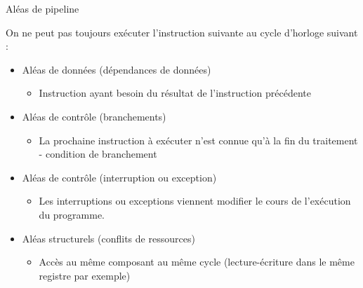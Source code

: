 %
\begin{Frame}{Aléas de pipeline}

\begin{block}{On ne peut pas toujours exécuter l'instruction suivante au cycle d'horloge suivant :}
       \begin{center}
 	\begin{itemize}

         \item Aléas de données (dépendances de données)
		\begin {itemize}
         		\item Instruction ayant besoin du résultat de l'instruction précédente
		\end{itemize}

	 \item Aléas de contrôle (branchements)
		\begin {itemize}
         		\item La prochaine instruction à exécuter n'est connue qu'à la fin du traitement - condition de branchement
		\end{itemize}

	 \item Aléas de contrôle (interruption ou exception)
		\begin {itemize}
         		\item Les interruptions ou exceptions viennent modifier le cours de l'exécution du programme.
		\end{itemize}

	 \item Aléas structurels (conflits de ressources)
		\begin {itemize}
         		\item Accès au même composant au même cycle (lecture-écriture dans le même registre par exemple)
		\end{itemize}

        \end{itemize}
       \end{center}
      \end{block}   

 


\end{Frame}



